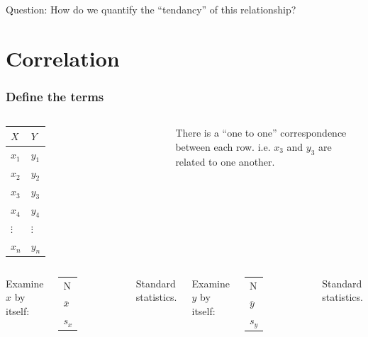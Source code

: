 \begin{frame}
  Question: How do we quantify the ``tendancy'' of this relationship?
\end{frame}


\section{Correlation}


\begin{frame}
  \frametitle{Define the terms}

  \begin{columns}

    \begin{tabular}{l|l}
      $X$ & $Y$ \\ \hline
      $x_1$ & $y_1$ \\
      $x_2$ & $y_2$ \\
      $x_3$ & $y_3$ \\
      $x_4$ & $y_4$ \\
      $\vdots$ & $\vdots$ \\
      $x_n$ & $y_n$ \\
    \end{tabular}


    \vfill


    {
      There is a ``one to one'' correspondence between each
      row. i.e. $x_3$ and $y_3$ are related to one another.

    }

    \vfill

  \end{columns}


  \begin{columns}

     {

      Examine $x$ by itself: \\
      \begin{tabular}{l}
        N \\
        $\bar{x}$ \\
        $s_x$
      \end{tabular}

      Standard statistics.

    }
      


     {

      Examine $y$ by itself: \\
      \begin{tabular}{l}
        N \\
        $\bar{y}$ \\
        $s_y$
      \end{tabular}

      Standard statistics.


    }


  \end{columns}


\end{frame}

